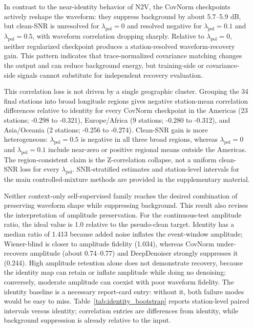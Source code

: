 \documentclass[review,12pt,authoryear]{elsarticle}
\newcommand{\lpol}{\lambda_{\mathrm{pol}}}
\begin{document}
In contrast to the near-identity behavior of N2V, the CovNorm checkpoints actively reshape the waveform: they suppress background by about 5.7--5.9 dB, but clean-SNR is unresolved for $\lpol=0$ and resolved negative for $\lpol=0.1$ and $\lpol=0.5$, with waveform correlation dropping sharply. Relative to $\lpol=0$, neither regularized checkpoint produces a station-resolved waveform-recovery gain. This pattern indicates that trace-normalized covariance matching changes the output and can reduce background energy, but training-side or covariance-side signals cannot substitute for independent recovery evaluation.

This correlation loss is not driven by a single geographic cluster. Grouping the 34 final stations into broad longitude regions gives negative station-mean correlation differences relative to identity for every CovNorm checkpoint in the Americas (23 stations; -0.298 to -0.321), Europe/Africa (9 stations; -0.280 to -0.312), and Asia/Oceania (2 stations; -0.256 to -0.274). Clean-SNR gain is more heterogeneous: $\lpol=0.5$ is negative in all three broad regions, whereas $\lpol=0$ and $\lpol=0.1$ include near-zero or positive regional means outside the Americas. The region-consistent claim is the Z-correlation collapse, not a uniform clean-SNR loss for every $\lpol$.
SNR-stratified estimates and station-level intervals for the main controlled-mixture methods are provided in the supplementary material.

Neither context-only self-supervised family reaches the desired combination of preserving waveform shape while suppressing background. This result also revises the interpretation of amplitude preservation. For the continuous-test amplitude ratio, the ideal value is 1.0 relative to the pseudo-clean target. Identity has a median ratio of 1.413 because added noise inflates the event-window amplitude; Wiener-blind is closer to amplitude fidelity (1.034), whereas CovNorm under-recovers amplitude (about 0.74--0.77) and DeepDenoiser strongly suppresses it (0.244). High amplitude retention alone does not demonstrate recovery, because the identity map can retain or inflate amplitude while doing no denoising; conversely, moderate amplitude can coexist with poor waveform fidelity. The identity baseline is a necessary report-card entry: without it, both failure modes would be easy to miss. Table~\ref{tab:identity_bootstrap} reports station-level paired intervals versus identity; correlation entries are differences from identity, while background suppression is already relative to the input.
\end{document}
